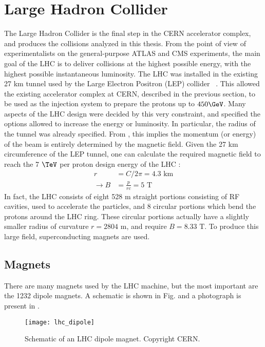 \section{Large Hadron Collider}

The Large Hadron Collider is the final step in the CERN accelerator complex, and produces the collisions analyzed in this thesis.
From the point of view of experimentalists on the general-purpose ATLAS and CMS experiments, the main goal of the LHC is to deliver collisions at the highest possible energy, with the highest possible instantaneous luminosity.
The LHC was installed in the existing 27 km tunnel used by the Large Electron Positron (LEP) collider ~\cite{lepDesign}.
This allowed the existing accelerator complex at CERN, described in the previous section, to be used as the injection system to prepare the protons up to $450 \GeV$.
Many aspects of the LHC design were decided by this very constraint, and specified the options allowed to increase the energy or luminosity.
In particular, the radius of the tunnel was already specified.
From , this implies the momentum (or energy) of the beam is entirely determined by the magnetic field.
Given the 27 km circumference of the LEP tunnel, one can calculate the required magnetic field to reach the 7 $\TeV$ per proton design energy of the LHC :
\begin{align}
r &= C / 2\pi = 4.3 \text{ km} \\
\rightarrow B &= \frac{p}{rc} = 5 \text{ T}
\end{align}
In fact, the LHC consists of eight 528 m straight portions consisting of RF cavities, used to accelerate the particles, and 8 circular portions which bend the protons around the LHC ring.
These circular portions actually have a slightly smaller radius of curvature $r = 2804 $ m, and require $B = 8.33 \text{ T}$.
To produce this large field, superconducting magnets are used.

\subsection{Magnets}

There are many magnets used by the LHC machine, but the most important are the 1232 dipole magnets.
A schematic is shown in Fig. and a photograph is present in .
\begin{figure}
\caption{Schematic of an LHC dipole magnet. Copyright CERN.}\label{fig:dipole_schematic}
\texttt{[image: lhc\_dipole]}
\end{figure}

